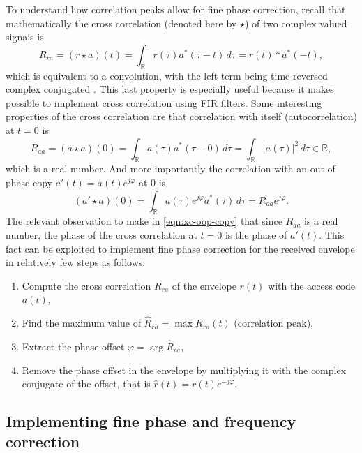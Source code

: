 To understand how correlation peaks allow for fine phase correction, recall that mathematically the cross correlation (denoted here by \(\star\)) of two complex valued signals is
\begin{equation}
	R_{ra}
	= (r \star a)(t)
	= \int_\mathbb{R} r(\tau) a^*(\tau - t) \,d\tau
	= r(t) * a^*(-t),
\end{equation}
which is equivalent to a convolution, with the left term being time-reversed complex conjugated \cite{Gallager}. This last property is especially useful because it makes possible to implement cross correlation using FIR filters. Some interesting properties of the cross correlation are that correlation with itself (autocorrelation) at \(t = 0\) is
\begin{equation}
	R_{aa} = (a \star a)(0)
	= \int_\mathbb{R} a(\tau) a^*(\tau - 0) \,d\tau
	= \int_\mathbb{R} |a(\tau)|^2 \,d\tau \in \mathbb{R},
\end{equation}
which is a real number. And more importantly the correlation with an out of phase copy \(a'(t) = a(t) e^{j\varphi}\) at 0 is
\begin{equation} \label{eqn:xc-oop-copy}
	(a' \star a)(0) 
	= \int_\mathbb{R} a(\tau)e^{j\varphi}  a^*(\tau) \,d\tau
	= R_{aa} e^{j\varphi}.
\end{equation}
The relevant observation to make in \eqref{eqn:xc-oop-copy} that since \(R_{aa}\) is a real number, the phase of the cross correlation at \(t = 0\) is the phase of \(a'(t)\). This fact can be exploited to implement fine phase correction for the received envelope in relatively few steps as follows:
\begin{enumerate}
	\item Compute the cross correlation \(R_{ra}\) of the envelope \(r(t)\) with the access code \(a(t)\),
	\item Find the maximum value of \(\hat{R}_{ra} = \max R_{ra}(t)\) (correlation peak),
	\item Extract the phase offset \(\varphi = \arg \hat{R}_{ra}\),
	\item Remove the phase offset in the envelope by multiplying it with the complex conjugate of the offset, that is \(\hat{r}(t) = r(t) e^{-j\varphi}\).
\end{enumerate}

\subsection{Implementing fine phase and frequency correction}

